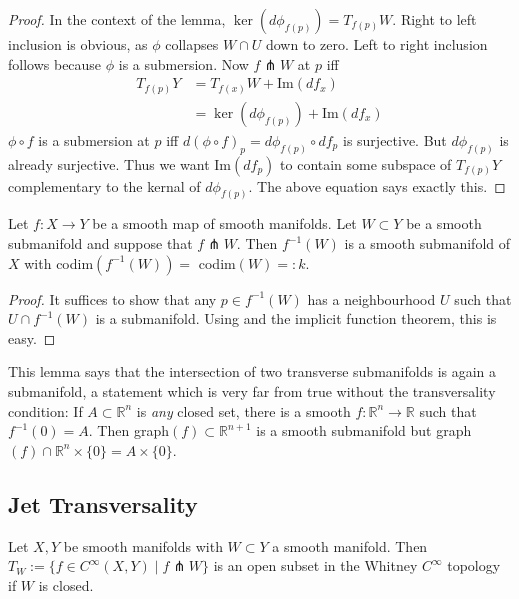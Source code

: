 \documentclass[12pt]{article}
\newcommand{\RR}{\mathbb{R}}
\begin{document}
\begin{proof}
    In the context of the lemma, $\ker (d\phi_{f(p)}) = T_{f(p)} W$. Right to left inclusion is obvious, as $\phi$ collapses $W \cap U$ down to zero. Left to right inclusion follows because $\phi$ is a submersion. Now $f\pitchfork W$ at $p$ iff
    \begin{align*}
        T_{f(p)} Y & = T_{f(x)} W + \text{Im} (df_x) \\
        & = \ker(d\phi_{f(p)}) + \text{Im}(df_x) 
    \end{align*}
    $\phi \circ f$ is a submersion at $p$ iff $d(\phi\circ f)_p = d\phi_{f(p)} \circ df_p$ is surjective. But $d\phi_{f(p)}$ is already surjective. Thus we want Im$(df_p)$ to contain some subspace of $T_{f(p)} Y$ complementary to the kernal of $d\phi_{f(p)}$. The above equation says exactly this. 
\end{proof}

\begin{lemma} \label{implicit transverse theorem}
    Let $f: X \to Y$ be a smooth map of smooth manifolds. Let $W \subset Y$ be a smooth submanifold and suppose that $f\pitchfork W$. Then $f^{-1}(W)$ is a smooth submanifold of $X$ with codim$(f^{-1}(W)) =$ codim$(W) =: k$. 
\end{lemma}

\begin{proof}
    It suffices to show that any $p \in f^{-1}(W)$ has a neighbourhood $U$ such that $U \cap f^{-1}(W)$ is a submanifold. Using  and the implicit function theorem, this is easy.
\end{proof}

This lemma says that the intersection of two transverse submanifolds is again a submanifold, a statement which is very far from true without the transversality condition: If $A \subset \RR^{n}$ is \emph{any} closed set, there is a smooth $f: \RR^n \to \RR$ such that $f^{-1}(0) = A$. Then graph$(f) \subset \RR^{n+1}$ is a smooth submanifold but graph$(f) \cap \RR^n \times \{ 0\} = A \times\{0\}$. 




\subsection{Jet Transversality}

\begin{lemma} \label{open if W closed}
    Let $X, Y$ be smooth manifolds with $W \subset Y$ a smooth manifold. Then $T_W := \{f\in C^\infty(X, Y)\mid f \pitchfork W \}$ is an open subset in the Whitney $C^\infty$ topology if $W$ is closed. 
\end{lemma}
\end{document}
